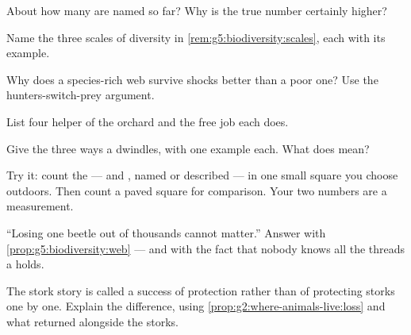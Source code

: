 \begin{exercise}[$\star$]\label{exo:g5:biodiversity:3}
About how many  are named so far? Why is the true
number certainly higher?
\end{exercise}

\begin{exercise}[$\star$]\label{exo:g5:biodiversity:4}
Name the three scales of diversity in
\cref{rem:g5:biodiversity:scales}, each with its example.
\end{exercise}

\begin{exercise}[$\star$]\label{exo:g5:biodiversity:5}
Why does a species-rich web survive shocks better than a
poor one? Use the hunters-switch-prey argument.
\end{exercise}

\begin{exercise}[$\star$]\label{exo:g5:biodiversity:6}
List four helper  of the orchard and the free job
each does.
\end{exercise}

\begin{exercise}[$\star$]\label{exo:g5:biodiversity:7}
Give the three ways a  dwindles, with one example
each. What does \emph{} mean?
\end{exercise}

\begin{exercise}[$\star$]\label{exo:g5:biodiversity:8}
Try it: count the  ---  and , named or
described --- in one small square you choose outdoors.
Then count a paved square for comparison. Your two numbers
are a  measurement.
\end{exercise}

\begin{exercise}[$\star\star$]\label{exo:g5:biodiversity:9}
``Losing one beetle  out of thousands cannot
matter.'' Answer with
\cref{prop:g5:biodiversity:web} --- and with the fact that
nobody knows all the threads a  holds.
\end{exercise}

\begin{exercise}[$\star\star$]\label{exo:g5:biodiversity:10}
The stork story is called a success of \emph{}
protection rather than of protecting storks one by one.
Explain the difference, using
\cref{prop:g2:where-animals-live:loss} and what returned
alongside the storks.
\end{exercise}

